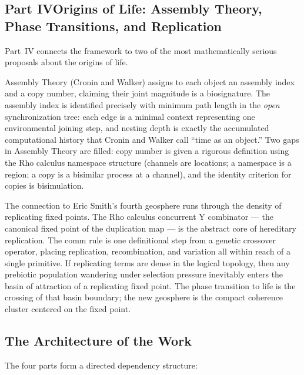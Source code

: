 \documentclass[12pt]{article}
\theoremstyle{remark}
\begin{document}
\subsection*{Part IV\quad Origins of Life: Assembly Theory,
Phase Transitions, and Replication}

Part~IV connects the framework to two of the most mathematically
serious proposals about the origins of life.

Assembly Theory (Cronin and Walker) assigns to each object an
assembly index and a copy number, claiming their joint magnitude
is a biosignature.
The assembly index is identified precisely with minimum path length
in the \emph{open} synchronization tree: each edge is a minimal
context representing one environmental joining step, and nesting
depth is exactly the accumulated computational history that
Cronin and Walker call ``time as an object.''
Two gaps in Assembly Theory are filled: copy number is given a
rigorous definition using the Rho calculus namespace structure
(channels are locations; a namespace is a region; a copy is a
bisimilar process at a channel), and the identity criterion for
copies is bisimulation.

The connection to Eric Smith's fourth geosphere runs through the
density of replicating fixed points.
The Rho calculus concurrent Y combinator --- the canonical fixed
point of the duplication map --- is the abstract core of hereditary
replication.
The comm rule is one definitional step from a genetic crossover
operator, placing replication, recombination, and variation all
within reach of a single primitive.
If replicating terms are dense in the logical topology, then any
prebiotic population wandering under selection pressure inevitably
enters the basin of attraction of a replicating fixed point.
The phase transition to life is the crossing of that basin
boundary; the new geosphere is the compact coherence cluster
centered on the fixed point.

\bigskip

\subsection*{The Architecture of the Work}

The four parts form a directed dependency structure:
\end{document}
